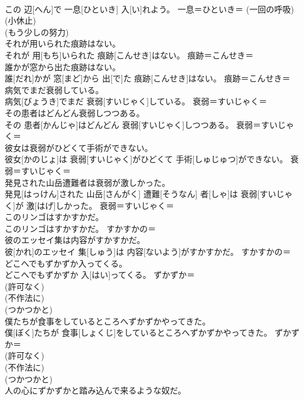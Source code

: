 \documentclass[8pt]{extreport}
\begin{document}
\begin{CJK}{UTF8}{min}
{\\	この 辺[へん]で 一息[ひといき] 入[い]れよう。	一息＝ひといき＝ (一回の呼吸) 
\\	(小休止) 
\\	(もう少しの努力) 
\\	それが用いられた痕跡はない。	
\\	それが 用[もち]いられた 痕跡[こんせき]はない。	痕跡＝こんせき＝ 
\\	誰かが窓から出た痕跡はない。	
\\	誰[だれ]かが 窓[まど]から 出[で]た 痕跡[こんせき]はない。	痕跡＝こんせき＝ 
\\	病気でまだ衰弱している。	
\\	病気[びょうき]でまだ 衰弱[すいじゃく]している。	衰弱＝すいじゃく＝ 
\\	その患者はどんどん衰弱しつつある。	
\\	その 患者[かんじゃ]はどんどん 衰弱[すいじゃく]しつつある。	衰弱＝すいじゃく＝ 
\\	彼女は衰弱がひどくて手術ができない。	
\\	彼女[かのじょ]は 衰弱[すいじゃく]がひどくて 手術[しゅじゅつ]ができない。	衰弱＝すいじゃく＝ 
\\	発見された山岳遭難者は衰弱が激しかった。	
\\	発見[はっけん]された 山岳[さんがく] 遭難[そうなん] 者[しゃ]は 衰弱[すいじゃく]が 激[はげ]しかった。	衰弱＝すいじゃく＝ 
\\	このリンゴはすかすかだ。	
\\	このリンゴはすかすかだ。	すかすかの＝ 
\\	彼のエッセイ集は内容がすかすかだ。	
\\	彼[かれ]のエッセイ 集[しゅう]は 内容[ないよう]がすかすかだ。	すかすかの＝ 
\\	どこへでもずかずか入ってくる。	
\\	どこへでもずかずか 入[はい]ってくる。	ずかずか＝ 
\\	(許可なく) 
\\	(不作法に) 
\\	(つかつかと)
\\	僕たちが食事をしているところへずかずかやってきた。	
\\	僕[ぼく]たちが 食事[しょくじ]をしているところへずかずかやってきた。	ずかずか＝ 
\\	(許可なく) 
\\	(不作法に) 
\\	(つかつかと)
\\	人の心にずかずかと踏み込んで来るような奴だ。	
}
\end{CJK}
\end{document}
